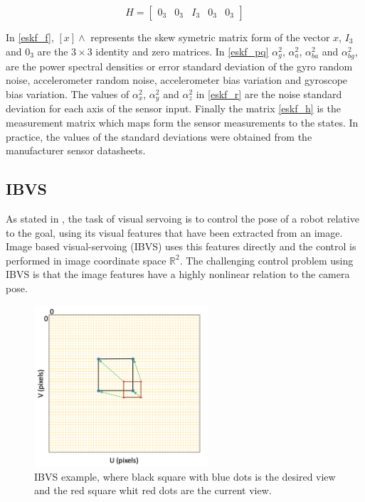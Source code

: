 \documentclass[conference]{IEEEtran}
\begin{document}
\begin{equation}
H = \left[    \begin{matrix} 0_{3} & 0_{3} & I_{3} & 0_{3} & 0_{3} \end{matrix} \right] \label{eskf_h}
\end{equation}

\noindent In \eqref{eskf_f}, $[x]\wedge$ represents the skew symetric matrix form of the vector $x$, $I_{3}$ and $0_{3}$ are the $3\times 3$ identity and zero matrices. In \eqref{eskf_pq} $\alpha^{2}_{g}$, $\alpha^{2}_{a}$, $\alpha^{2}_{ba}$ and $\alpha^{2}_{bg}$, are the power spectral densities or error standard deviation of the gyro random noise, accelerometer random noise, accelerometer bias variation and gyroscope bias variation. The values of $\alpha^{2}_{x}$, $\alpha^{2}_{y}$ and $\alpha^{2}_{z}$ in \eqref{eskf_r} are the noise standard deviation for each axis of the sensor input. Finally the matrix \eqref{eskf_h} is the measurement matrix which maps form the sensor measurements to the states. In practice, the values of the standard deviations were obtained from the manufacturer sensor datasheets.

\subsection{IBVS}
As stated in \cite{corke}, the task of visual servoing is to control the pose of a robot relative to the goal, using its visual features that have been extracted from an image. Image based visual-servoing (IBVS) uses this features directly and the control is performed in image coordinate space $\mathbb{R}^{2}$. The challenging control problem using IBVS is that the image features have a highly nonlinear relation to the camera pose.

\begin{figure}
\centering
\includegraphics[width=6.5cm, height=6cm]{Images/ibvs_goal.png}
\caption{IBVS example, where black square with blue dots is the desired view and the red square whit red dots are the current view.}
\label{ibvs_goal}
\end{figure}
\end{document}

